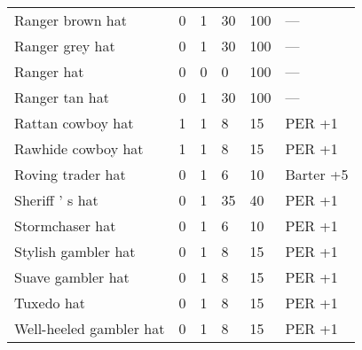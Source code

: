 \documentclass{report}
\begin{document}
\begin{table}[H]
\begin{table}[H]
\begin{table}[H]
\begin{table}[H]
\begin{table}[H]
\begin{table}[H]
\begin{table}[H]
\begin{table}[H]
\begin{table}[H]
\begin{table}[H]
\begin{table}[H]
\begin{table}[H]
\begin{table}[H]
\begin{table}[H]
\begin{table}[H]
\begin{table}[H]
\begin{table}[H]
\begin{table}[H]
\begin{table}[H]
\begin{table}[H]
\begin{table}[H]
\begin{table}[H]
\begin{tabular}{p{30mm}p{30mm}p{30mm}p{30mm}p{30mm}p{30mm}}
Ranger brown hat  & 0 & 1 & 30 & 100 & —  \\
Ranger grey hat  & 0 & 1 & 30 & 100 & —  \\
Ranger hat  & 0 & 0 & 0 & 100 & —  \\
Ranger tan hat  & 0 & 1 & 30 & 100 & —  \\
Rattan cowboy hat  & 1 & 1 & 8 & 15 & PER +1  \\
Rawhide cowboy hat  & 1 & 1 & 8 & 15 & PER +1  \\
Roving trader hat  & 0 & 1 & 6 & 10 & Barter +5  \\
Sheriff ' s hat  & 0 & 1 & 35 & 40 & PER +1  \\
Stormchaser hat  & 0 & 1 & 6 & 10 & PER +1  \\
Stylish gambler hat  & 0 & 1 & 8 & 15 & PER +1  \\
Suave gambler hat  & 0 & 1 & 8 & 15 & PER +1  \\
Tuxedo hat  & 0 & 1 & 8 & 15 & PER +1  \\
Well-heeled gambler hat  & 0 & 1 & 8 & 15 & PER +1  \\
  \end{tabular}

\end{table}
\end{table}
\end{table}
\end{table}
\end{table}
\end{table}
\end{table}
\end{table}
\end{table}
\end{table}
\end{table}
\end{table}
\end{table}
\end{table}
\end{table}
\end{table}
\end{table}
\end{table}
\end{table}
\end{table}
\end{table}
\end{table}
\end{document}
